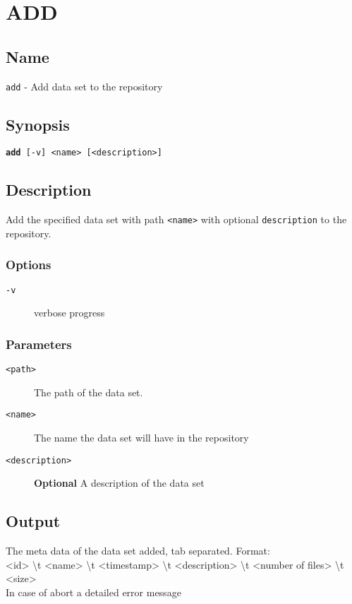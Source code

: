 \documentclass{article} %
\begin{document}
		\section*{ADD}
		\subsection*{Name}
		\texttt{add} - Add data set to the repository
		\subsection*{Synopsis}
		\texttt{\textbf{add} [-v] <name> [<description>]}
		\subsection*{Description}
		Add the specified data set with path \texttt{<name>} with optional \texttt{description} to the repository.\\
		
		\noindent
		\subsubsection*{Options}
		\begin{description}
			\item[\texttt{-v}] verbose progress
		\end{description}
		
		\subsubsection*{Parameters}
		\begin{description}
			\item[\texttt{<path>}] The path of the data set.
			\item[\texttt{<name>}] The name the data set will have in the repository
			\item[\texttt{<description>}] \textbf{Optional} A description of the data set
		\end{description}
		
		\subsection*{Output}
		The meta data of the data set added, tab separated. Format:\\<id> \textbackslash t <name> \textbackslash t <timestamp> \textbackslash t <description> \textbackslash t <number of files> \textbackslash t <size>\\
		In case of abort a detailed error message
		
\end{document}
